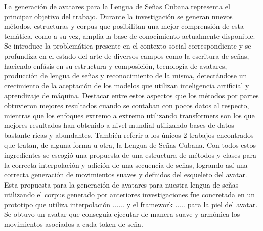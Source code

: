 \begin{conclusions}
  La generación de avatares para la Lengua de Señas Cubana representa el principar objetivo del trabajo. Durante la investigación se generan nuevos métodos, estructuras y corpus que posibilitan una mejor comprensión de esta temática, como a su vez, amplia la base de conocimiento actualmente disponible.
 	Se introduce la problemática presente en el contexto social correspondiente y se profundiza en el estado del arte de diversos campos como la escritura de señas, haciendo enfásis en su estructura y composición, tecnología de avatares, producción de lengua de señas y reconocimiento de la misma, detectándose un crecimiento de la aceptación de los modelos que utilizan inteligencia artificial y  aprendizaje de máquina.
 	Destacar entre estos aspectos que los métodos por partes obtuvieron mejores resultados cuando se contaban con pocos datos al respecto, mientras que los enfoques extremo a extremo utilizando transformers son los que mejores resultados han obtenido a nivel mundial utilizando bases de datos bastante ricas y abundantes. También referir a los únicos 2 trabajos encontrados que tratan, de alguna forma u otra, la Lengua de Señas Cubana.
 	Con todos estos ingredientes se escogió una propuesta de una estructura de métodos y clases para la correcta interpolación y adición de una secuencia de señas, logrando así una correcta generación de movimientos suaves y defnidos del esqueleto del avatar. Esta propuesta para la generación de avatares para nuestra lengua de señas utilizando el corpus generado por anteriores investigaciones fue concretada en un prototipo que utiliza interpolación ...... y el framework ..... para la piel del avatar.
 	Se obtuvo un avatar que conseguía ejecutar de manera suave y armónica los movimientos asociados a cada token de seña.
\end{conclusions}
